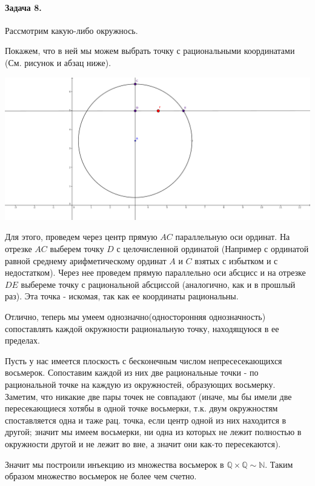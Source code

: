 \documentclass{article}
\newcommand{\N}{\mathbb{N}}
\newcommand{\Q}{\mathbb{Q}}
\begin{document}
    \paragraph{Задача 8.}
    Рассмотрим какую-либо окружнось.

    Покажем, что в ней мы можем выбрать точку с рациональными координатами (См. рисунок и абзац ниже).

    \begin{center}
    \includegraphics[scale=0.8]{8_1}
    \end{center}

    Для этого, проведем через центр прямую $AC$ параллельную оси ординат. На отрезке $AC$ выберем точку $D$ с целочисленной ординатой (Например с ординатой равной среднему арифметическому ординат $A$ и $C$ взятых с избытком и с недостатком). 
    Через нее проведем прямую параллельно оси абсцисс и на отрезке $DE$ выбереме точку с рациональной абсциссой (аналогично, как и в прошлый раз). Эта точка - искомая, так как ее координаты рациональны.

    Отлично, теперь мы умеем однозначно(односторонняя однозначность) сопоставлять каждой окружности рациональную точку, находящуюся в ее пределах.

    Пусть у нас имеется плоскость с бесконечным числом непресесекающихся восьмерок. Сопоставим каждой из них две рациональные точки - по рациональной точке на каждую из окружностей, образующих восьмерку. Заметим, что никакие две пары точек не совпадают (иначе, мы бы имели две пересекающиеся хотябы в одной точке восьмерки, т.к. двум окружностям споставляется одна и таже рац. точка, если центр одной из них находится в другой; значит мы имеем восьмерки, ни одна из которых не лежит полностью в окружности другой и не лежит во вне, а значит они как-то пересекаются).

    Значит мы построили инъекцию из множества восьмерок в $\Q \times \Q \sim \N$. Таким образом множество восьмерок не более чем счетно.
\end{document}
